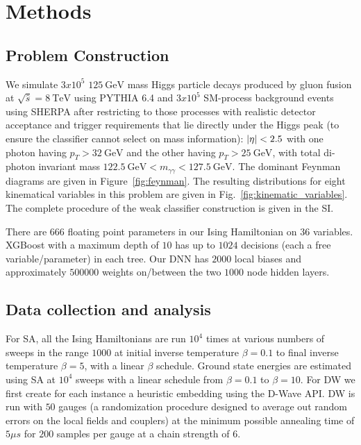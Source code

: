 \documentclass[.chapters/Higgs/.chapters/Higgs/main.tex]{subfiles}
\begin{document}
\FloatBarrier
\newpage\newpage
\FloatBarrier
\clearpage

\section*{Methods}

\subsection*{Problem Construction}
We simulate $3x10^5$ $\SI{125}{\giga\electronvolt}$ mass Higgs particle decays produced by gluon fusion at $\sqrt{\hat{s}} = \SI{8}{\tera\electronvolt}$ using PYTHIA 6.4 \cite{Pythia:2006} and $3x10^5$ SM-process background events using SHERPA \cite{Sherpa:2009} after restricting to those processes with realistic detector acceptance and trigger requirements that lie directly under the Higgs peak (to ensure the classifier cannot select on mass information): $\abs{\eta}<2.5$ with one photon having $p_T>\SI{32}{\giga\electronvolt}$ and the other having $p_T>\SI{25}{\giga\electronvolt}$, with total di-photon invariant mass $\SI{122.5}{\giga\electronvolt} < m_{\gamma\gamma} < \SI{127.5}{\giga\electronvolt}$. The dominant Feynman diagrams 
are given in Figure~\ref{fig:feynman}. The resulting distributions for eight kinematical variables in this problem are given in Fig.~\ref{fig:kinematic_variables}. The complete procedure of the weak classifier construction is given in the SI.

There are $666$ floating point parameters in our Ising Hamiltonian on $36$ variables. XGBoost with a maximum depth of $10$ has up to $1024$ decisions (each a free variable/parameter) in each tree. Our DNN has $2000$ local biases and approximately $500000$ weights on/between the two $1000$ node hidden layers. 



\subsection*{Data collection and analysis}
For SA, all the Ising Hamiltonians are run $10^4$ times at various numbers of sweeps in the range $1000$ at initial inverse temperature $\beta=0.1$ to final inverse temperature $\beta=5$, with a linear $\beta$ schedule. Ground state energies are  estimated using SA at $10^4$ sweeps with a linear schedule from $\beta=0.1$ to $\beta=10$.
For DW we first create for each instance a heuristic embedding using the D-Wave API.  DW is run with $50$ gauges \cite{q-sig2} (a randomization procedure designed
to average out random errors on the local fields and couplers) at the minimum possible annealing time of $5\mu s$ for $200$ samples per gauge at a chain strength of $6$. 
\end{document}
